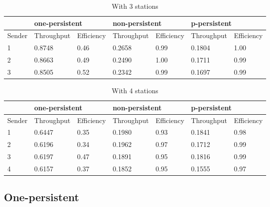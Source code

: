 \documentclass[14pt,titlepage, a4paper]{extarticle}
\begin{document}
\begin{table}[!ht]
	\caption{With 3 stations}
	\bigskip
	\begin{tabular}{|l|l|l|l|l|l|l|}
		\hline
		&
		\multicolumn{2}{|l|}{one-persistent} & 
		\multicolumn{2}{|l|}{non-persistent} & 
		\multicolumn{2}{|l|}{p-persistent}\\
		\hline
		Sender &
		Throughput & Efficiency & 
		Throughput & Efficiency & 
		Throughput & Efficiency \\ 
		\hline
		1 &
		0.8748 & 0.46 &
		0.2658 & 0.99 &
		0.1804 & 1.00\\
		\hline
		2 &
		0.8663 & 0.49 & 
		0.2490 & 1.00 &
		0.1711 & 0.99\\
		\hline
		3 &
		0.8505 & 0.52 &
		0.2342 & 0.99 &
		0.1697 & 0.99\\
		\hline
	\end{tabular}
\end{table}

\begin{table}[!ht]
	\caption{With 4 stations}
	\bigskip
	\begin{tabular}{|l|l|l|l|l|l|l|}
		\hline
		&
		\multicolumn{2}{|l|}{one-persistent} & 
		\multicolumn{2}{|l|}{non-persistent} & 
		\multicolumn{2}{|l|}{p-persistent}\\
		\hline
		Sender &
		Throughput & Efficiency & 
		Throughput & Efficiency & 
		Throughput & Efficiency \\ 
		\hline
		1 &
		0.6447 & 0.35 &
		0.1980 & 0.93 & 
		0.1841 & 0.98\\
		\hline
		2 & 
		0.6196 & 0.34 &
		0.1962 & 0.97 & 
		0.1712 & 0.99\\
		\hline
		3 &
		0.6197 & 0.47 &
		0.1891 & 0.95 & 
		0.1816 & 0.99\\
		\hline
		4 &
		0.6157 & 0.37 & 
		0.1852 & 0.95 & 
		0.1555 & 0.97\\
		\hline
	\end{tabular}
\end{table}

\pagebreak
\subsection{One-persistent}
\null
{}
\end{document}
